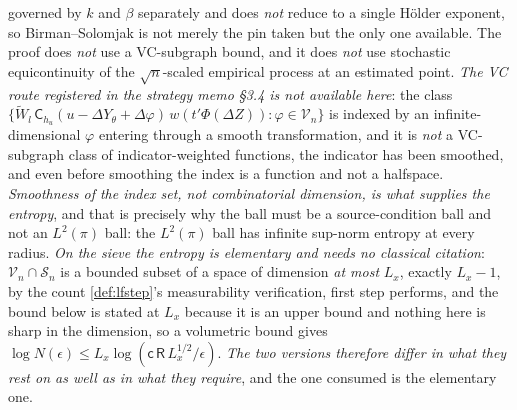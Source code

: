 \begin{lemma}
governed by $k$ and $\beta$ separately and does \emph{not} reduce to a single H\"older exponent, so
Birman--Solomjak is not merely the pin taken but the only one
available. The proof does
\emph{not} use a VC-subgraph bound, and it does \emph{not} use stochastic equicontinuity of the
$\sqrt n$-scaled empirical process at an estimated point. \emph{The VC route registered in the
strategy memo \S3.4 is not available here}: the class
$\{\widetilde W_l\,\mathsf C_{h_u}(u-\Delta Y_\theta+\Delta\varphi)\,w(t'\Phi(\Delta Z)):\varphi\in\mathcal V_n\}$
is indexed by an infinite-dimensional $\varphi$ entering through a smooth transformation, and it is
\emph{not} a VC-subgraph class of indicator-weighted functions, the indicator has been smoothed, and
even before smoothing the index is a function and not a halfspace. \emph{Smoothness of the index set,
not combinatorial dimension, is what supplies the entropy}, and that is precisely why the ball must be
a source-condition ball and not an $L^{2}(\pi)$ ball: the $L^{2}(\pi)$ ball has infinite sup-norm
entropy at every radius.
\emph{On the sieve the entropy is elementary and needs no classical citation}: $\mathcal V_n\cap\mathcal S_n$
is a bounded subset of a space of dimension \emph{at most} $L_x$, exactly $L_x-1$, by the count
\cref{def:lfstep}'s measurability verification, first step performs, and the bound below is stated at $L_x$ because it is an upper
bound and nothing here is sharp in the dimension, so a volumetric bound gives
$\log N(\epsilon)\le L_x\log(\mathsf c\,\mathsf R\,L_x^{1/2}/\epsilon)$. \emph{The two versions
therefore differ in what they rest on as well as in what they require}, and the one consumed is the
elementary one.
\end{lemma}

